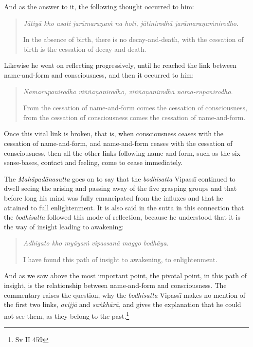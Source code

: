 And as the answer to it, the following thought occurred to him:

\begin{quote}
\emph{Jātiyā kho asati jarāmaraṇaṁ na hoti, jātinirodhā jarāmaraṇaṁnirodho.}

In the absence of birth, there is no decay-and-death, with the cessation of birth is the cessation of decay-and-death.
\end{quote}

Likewise he went on reflecting progressively, until he reached the link between name-and-form and consciousness, and then it occurred to him:

\begin{quote}
\emph{Nāmarūpanirodhā viññāṇanirodho, viññāṇanirodhā nāma-rūpanirodho.}

From the cessation of name-and-form comes the cessation of consciousness, from the cessation of consciousness comes the cessation of name-and-form.
\end{quote}

Once this vital link is broken, that is, when consciousness ceases with the cessation of name-and-form, and name-and-form ceases with the cessation of consciousness, then all the other links following name-and-form, such as the six sense-bases, contact and feeling, come to cease immediately.

The \emph{Mahāpadānasutta} goes on to say that the \emph{bodhisatta} Vipassī continued to dwell seeing the arising and passing away of the five grasping groups and that before long his mind was fully emancipated from the influxes and that he attained to full enlightenment. It is also said in the sutta in this connection that the \emph{bodhisatta} followed this mode of reflection, because he understood that it is the way of insight leading to awakening:

\begin{quote}
\emph{Adhigato kho myāyaṁ vipassanā maggo bodhāya.}

I have found this path of insight to awakening, to enlightenment.
\end{quote}

And as we saw above the most important point, the pivotal point, in this path of insight, is the relationship between name-and-form and consciousness. The commentary raises the question, why the \emph{bodhisatta} Vipassī makes no mention of the first two links, \emph{avijjā} and \emph{saṅkhārā}, and gives the explanation that he could not see them, as they belong to the past.\footnote{Sv II 459}

